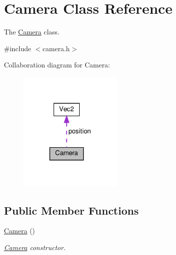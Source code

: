 \hypertarget{classCamera}{}\section{Camera Class Reference}
\label{classCamera}


The \hyperlink{classCamera}{Camera} class.  




{\ttfamily \#include $<$camera.\+h$>$}



Collaboration diagram for Camera\+:
\nopagebreak
\begin{figure}[H]
\begin{center}
\leavevmode
\includegraphics[width=143pt]{classCamera__coll__graph}
\end{center}
\end{figure}
\subsection*{Public Member Functions}
\begin{DoxyCompactItemize}
\item 
\mbox{\label{classCamera_a01f94c3543f56ede7af49dc778f19331}} 
\hyperlink{classCamera_a01f94c3543f56ede7af49dc778f19331}{Camera} ()
\begin{DoxyCompactList}\small\item\em \hyperlink{classCamera}{Camera} constructor. \end{DoxyCompactList}\end{DoxyCompactItemize}
